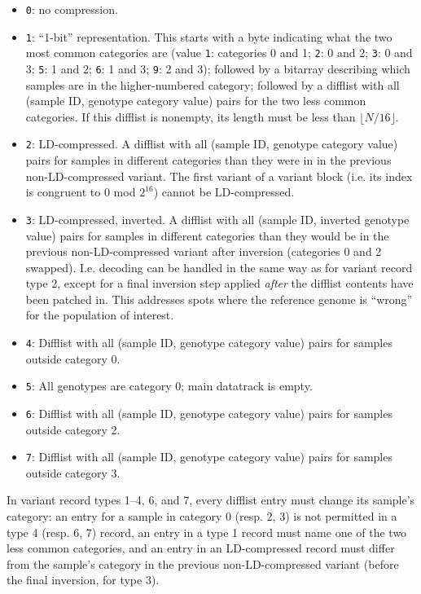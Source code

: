 \documentclass[8pt]{article}
\begin{document}
\begin{itemize}
\item \texttt{0}: no compression.
\item \texttt{1}: ``1-bit'' representation.  This starts with a byte indicating
  what the two most common categories are (value \texttt{1}: categories 0 and
  1; \texttt{2}: 0 and 2; \texttt{3}: 0 and 3; \texttt{5}: 1 and 2; \texttt{6}:
  1 and 3; \texttt{9}: 2 and 3); followed by a bitarray describing which
  samples are in the higher-numbered category; followed by a difflist with all
  (sample ID, genotype category value) pairs for the two less common
  categories.  If this difflist is nonempty, its length must be less than
  $\lfloor N/16\rfloor $.
\item \texttt{2}: LD-compressed.  A difflist with all (sample ID, genotype
  category value) pairs for samples in different categories than they were in
  in the previous non-LD-compressed variant.  The first variant of a variant
  block (i.e. its index is congruent to 0 mod $2^{16}$) cannot be
  LD-compressed.
\item \texttt{3}: LD-compressed, inverted.  A difflist with all (sample ID,
  inverted genotype value) pairs for samples in different categories than they
  would be in the previous non-LD-compressed variant after inversion
  (categories 0 and 2 swapped).  I.e. decoding can be handled in the same way
  as for variant record type 2, except for a final inversion step applied
  \textit{after} the difflist contents have been patched in.  This addresses
  spots where the reference genome is ``wrong'' for the population of interest.
\item \texttt{4}: Difflist with all (sample ID, genotype category value) pairs
  for samples outside category 0.
\item \texttt{5}: All genotypes are category 0; main datatrack is empty.
\item \texttt{6}: Difflist with all (sample ID, genotype category value) pairs
  for samples outside category 2.
\item \texttt{7}: Difflist with all (sample ID, genotype category value) pairs
  for samples outside category 3.
\end{itemize}

In variant record types 1--4, 6, and 7, every difflist entry must change its
sample's category: an entry for a sample in category 0 (resp. 2, 3) is not
permitted in a type 4 (resp. 6, 7) record, an entry in a type 1 record must
name one of the two less common categories, and an entry in an LD-compressed
record must differ from the sample's category in the previous
non-LD-compressed variant (before the final inversion, for type 3).
\end{document}
